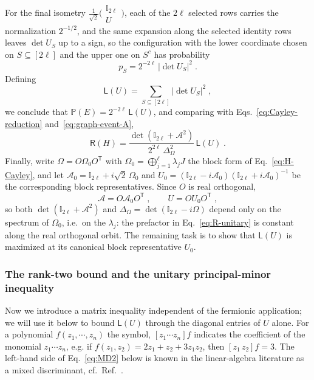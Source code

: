 \documentclass[prx,twocolumn,superscriptaddress,aps,10pt, frontmatterverbose, reprint,footinbib,longbibliography=true]{revtex4-2}
\newcommand{\trans}{\mathsf{T}}
\providecommand{\DIFaddtex}[1]{{\protect\color{red}#1}} %
\providecommand{\DIFaddbegin}{\protect\color{red}} %
\providecommand{\DIFaddend}{\protect\color{black}} %
\providecommand{\DIFaddtex}[1]{\texorpdfstring{\DIFaddtex{#1}}{#1}} %
\providecommand{\DIFadd}[1]{\texorpdfstring{\DIFaddtex{#1}}{#1}} %
\newcommand{\DIFaddincludegraphics}[2][]{{\color{blue}\fbox{\DIFOincludegraphics[#1]{#2}}}} %
\DeclareRobustCommand{\DIFaddbegin}{\DIFOaddbegin \let\includegraphics\DIFaddincludegraphics} %
\DeclareRobustCommand{\DIFaddend}{\DIFOaddend \let\includegraphics\DIFOincludegraphics} %
\begin{document}
For the final isometry $\frac{1}{\sqrt2}\big(\begin{smallmatrix}\mathbb{I}_{2\ell}\\ U\end{smallmatrix}\big)$, each of the $2\ell$ selected rows carries the normalization $2^{-1/2}$, and the same expansion along the selected identity rows leaves $\det U_S$ up to a sign, so the configuration with the lower coordinate chosen on $S\subseteq[2\ell]$ and the upper one on $S^c$ has probability
\begin{equation}
    p_S=2^{-2\ell}\,|\det U_S|^2\;.
\end{equation}
Defining
\begin{equation}
    \mathsf{L}(U)=\sum_{S\subseteq[2\ell]}|\det U_S|^2\;,
    \label{eq:L-definition}
    \end{equation}
we conclude that $\mathbb{P}(E)=2^{-2\ell}\,\mathsf{L}(U)$, and comparing with Eqs.~\eqref{eq:Cayley-reduction} and~\eqref{eq:graph-event-A},
\begin{equation}
    \mathsf{R}(H)=\frac{\det(\mathbb{I}_{2\ell}+\mathcal{A}^2)}{2^{2\ell}\,\Delta_\Omega^2}\,\mathsf{L}(U)\;.
    \label{eq:R-unitary}
\end{equation}
Finally, write $\Omega=O\Omega_0O^{\trans}$ with $\Omega_0=\bigoplus_{j=1}^{\ell}\lambda_jJ$ the block form of Eq.~\eqref{eq:H-Cayley}, and let $\mathcal{A}_0=\mathbb{I}_{2\ell}+i\sqrt2\,\Omega_0$ and $U_0=(\mathbb{I}_{2\ell}-i\mathcal{A}_0)(\mathbb{I}_{2\ell}+i\mathcal{A}_0)^{-1}$ be the corresponding block representatives. Since $O$ is real orthogonal,
\begin{equation}
    \mathcal{A}=O\mathcal{A}_0O^{\trans}\;,\qquad U=OU_0O^{\trans}\;,
\end{equation}
so both $\det(\mathbb{I}_{2\ell}+\mathcal{A}^2)$ and $\Delta_\Omega=\det(\mathbb{I}_{2\ell}-i\Omega)$ depend only on the spectrum of $\Omega_0$, i.e.\ on the $\lambda_j$: the prefactor in Eq.~\eqref{eq:R-unitary} is constant along the real orthogonal orbit. The remaining task is to show that $\mathsf{L}(U)$ is maximized at its canonical block representative $U_0$.

\subsubsection{ The rank-two bound and the unitary principal-minor inequality}
\label{app:proof:MD2}

Now we introduce a matrix inequality independent of the fermionic application; we will use it below to bound $\mathsf{L}(U)$ through the diagonal entries of $U$ alone. 
For a polynomial $f(z_1, \cdots,z_n)$ the symbol, $[z_1\cdots z_n]f$ indicates the coefficient of the monomial $z_1\cdots z_n$, e.g. if \DIFaddbegin \DIFadd{$f(z_1,z_2)=2z_1+z_2+3 z_1z_2$}\DIFaddend , then $[z_1 \, z_2]f=3$.
The left-hand side of Eq.~\eqref{eq:MD2} below is known in the linear-algebra literature as a mixed discriminant, cf.\ Ref.~\cite{Bapat1989}.
\end{document}
